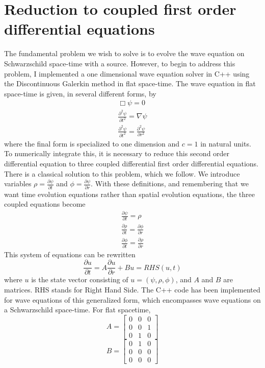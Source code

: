 \section{Reduction to coupled first order differential equations}


The fundamental problem we wish to solve is to evolve the wave equation on Schwarzschild space-time with a source. However, to begin to address this problem, I implemented a one dimensional wave equation solver in C++ using the Discontinuous Galerkin method in flat space-time. The wave equation in flat space-time is given, in several different forms, by
\begin{eqnarray}
  \Box\psi=0\\
  \frac{\partial^2\psi}{\partial t^2}=\nabla\psi\\
  \frac{\partial^2\psi}{\partial t^2}=\frac{\partial^2 \psi}{\partial r^2}
\end{eqnarray}
where the final form is specialized to one dimension and $c=1$ in natural units. To numerically integrate this, it is necessary to reduce this second order differential equation to three coupled differential first order differential equations. There is a classical solution to this problem, which we follow. We introduce variables $\rho=\frac{\partial \psi}{\partial t}$ and $\phi = \frac{\partial\psi}{\partial r}$. With these definitions, and remembering that we want time evolution equations rather than spatial evolution equations, the three coupled equations become
\begin{eqnarray}
  \frac{\partial\psi}{\partial t} = \rho\nonumber\\
  \frac{\partial\rho}{\partial t} = \frac{\partial \phi}{\partial r}\nonumber\\
  \frac{\partial\phi}{\partial t} = \frac{\partial \rho}{\partial r}
  \label{stateev}
\end{eqnarray}
This system of equations can be rewritten
\begin{equation}
  \frac{\partial u}{\partial t} = A\frac{\partial u}{\partial r} + Bu\nonumber = RHS(u,t)
  \label{matrixdiff}
\end{equation}
where $u$ is the state vector consisting of $u=(\psi,\rho,\phi)$, and $A$ and $B$ are matrices. RHS stands for Right Hand Side. The C++ code has been implemented for wave equations of this generalized form, which encompasses wave equations on a Schwarzschild space-time. For flat spacetime,
\[
A=
\begin{bmatrix}
  0 & 0 & 0\\
  0 & 0 & 1\\
  0 & 1 & 0
\end{bmatrix}
\]
\[B=
\begin{bmatrix}
  0 & 1 & 0\\
  0 & 0 & 0\\
  0 & 0 & 0
\end{bmatrix}
\]




